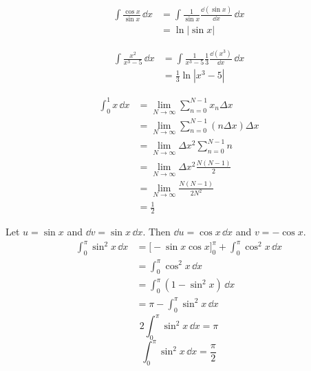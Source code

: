 \begin{Solution}
  \label{solution int cos x / sin x}
  \begin{align*}
    \int \frac{\cos x}{\sin x} \,\dd x
    &= \int \frac{1}{\sin x} \frac{\dd (\sin x)}{\dd x} \,\dd x \\
    &= \ln| \sin x |
  \end{align*}
\end{Solution}


\begin{Solution}
  \label{solution int x2 / x3-5}
  \begin{align*}
    \int \frac{x^2}{x^3 - 5} \,\dd x
    &= \int \frac{1}{x^3 - 5} \frac{1}{3}\frac{\dd (x^3)}{\dd x} \,\dd x \\
    &= \frac{1}{3} \ln | x^3 - 5 |
  \end{align*}
\end{Solution}







\begin{Solution}
  \label{solution int by sum x}
  \begin{align*}
    \int_0^1 x \,\dd x
    &= \lim_{N \to \infty} \sum_{n=0}^{N-1} x_n \Delta x \\
    &= \lim_{N \to \infty} \sum_{n=0}^{N-1} (n \Delta x) \Delta x \\
    &= \lim_{N \to \infty} \Delta x^2 \sum_{n=0}^{N-1} n \\
    &= \lim_{N \to \infty} \Delta x^2 \frac{N(N-1)}{2} \\
    &= \lim_{N \to \infty} \frac{N(N-1)}{2N^2} \\
    &= \frac{1}{2}
  \end{align*}
\end{Solution}



\begin{Solution}
  \label{solution int 0 pi sin2 x}
  Let $u=\sin x$ and $\dd v = \sin x \,\dd x$.  Then $\dd u = \cos x \,\dd x$ and
  $v = -\cos x$.
  \begin{align*}
    \int_0^\pi \sin^2 x \,\dd x
    &= \big[ -\sin x \cos x \big]_0^\pi + \int_0^\pi \cos^2 x \,\dd x \\
    &= \int_0^\pi \cos^2 x \,\dd x \\
    &= \int_0^\pi (1-\sin^2 x) \,\dd x \\
    &= \pi - \int_0^\pi \sin^2 x \,\dd x
  \end{align*}
  \[
  2 \int_0^\pi \sin^2 x \,\dd x = \pi
  \]
  \[
  \int_0^\pi \sin^2 x \,\dd x = \frac{\pi}{2}
  \]
\end{Solution}



